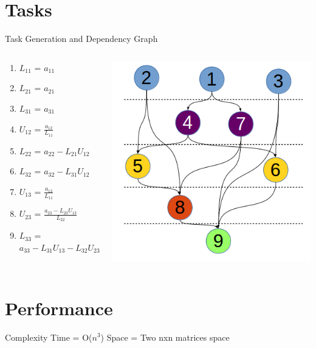 \documentclass{beamer}
\begin{document}
\section{Tasks}
\begin{frame}{Task Generation and Dependency Graph}
\begin{columns}
\begin{column}{4cm}
\begin{enumerate}
\item $L_{11}$ = $a_{11}$
\item $L_{21}$ = $a_{21}$
\item $L_{31}$ = $a_{31}$
\item $U_{12}$ = $\frac{a_{12}}{L_{11}}$
\item $L_{22}$ = $a_{22} - L_{21}U_{12}$
\item $L_{32}$ = $a_{32} - L_{31}U_{12}$
\item $U_{13}$ = $\frac{a_{13}}{L_{11}}$
\item $U_{23}$ = $\frac{a_{23} - L_{23}U_{13}}{L_{22}}$
\item $L_{33}$ = $a_{33} - L_{31}U_{13} - L_{32}U_{23}$
\end{enumerate}
\end{column}
\begin{column}{7cm}
\includegraphics[scale=.5]{taskdep.png}
\end{column}
\end{columns}
\end{frame}

\section{Performance}
\begin{frame}{Complexity}
Time  = O($n^3$)
Space = Two nxn matrices space
\end{frame}
\end{document}
